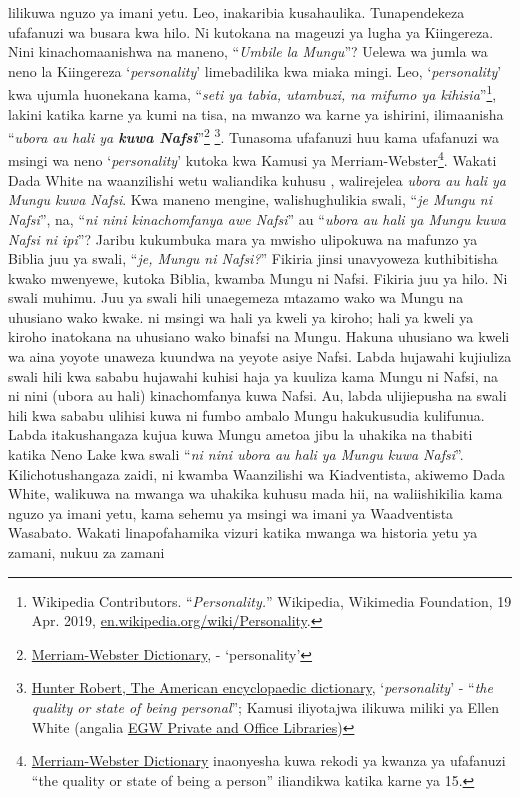  lilikuwa nguzo ya imani yetu. Leo, inakaribia kusahaulika. Tunapendekeza ufafanuzi wa busara kwa hilo. Ni kutokana na mageuzi ya lugha ya Kiingereza. Nini kinachomaanishwa na maneno, “\textit{Umbile la Mungu}”? Uelewa wa jumla wa neno la Kiingereza ‘\textit{personality}’ limebadilika kwa miaka mingi. Leo, ‘\textit{personality}’ kwa ujumla huonekana kama, “\textit{seti ya tabia, utambuzi, na mifumo ya kihisia}”\footnote{Wikipedia Contributors. “\textit{Personality.}” Wikipedia, Wikimedia Foundation, 19 Apr. 2019, \href{https://en.wikipedia.org/wiki/Personality}{en.wikipedia.org/wiki/Personality}.}, lakini katika karne ya kumi na tisa, na mwanzo wa karne ya ishirini, ilimaanisha “\textit{ubora au hali ya \textbf{kuwa Nafsi}}”\footnote{\href{https://www.merriam-webster.com/dictionary/personality}{Merriam-Webster Dictionary}, - ‘personality’} \footnote{\href{https://babel.hathitrust.org/cgi/pt?id=mdp.39015050663213&view=1up&seq=780}{Hunter Robert, The American encyclopaedic dictionary}, ‘\textit{personality}’ - “\textit{the quality or state of being personal}”; Kamusi iliyotajwa ilikuwa miliki ya Ellen White (angalia \href{https://repo.adventistdigitallibrary.org/PDFs/adl-22/adl-22251050.pdf?_ga=2.116010630.1065317374.1621993520-1506151612.1617862694&fbclid=IwAR3vwmp8jxtnpPEKv0KD9mCv8dJpmRGoyIXW0CkbQAjbU0h6YaBGqhgBzbk}{EGW Private and Office Libraries})}. Tunasoma ufafanuzi huu kama ufafanuzi wa msingi wa neno ‘\textit{personality}’ kutoka kwa Kamusi ya Merriam-Webster\footnote{\href{https://www.merriam-webster.com/dictionary/personality\#word-history}{Merriam-Webster Dictionary} inaonyesha kuwa rekodi ya kwanza ya ufafanuzi “the quality or state of being a person” iliandikwa katika karne ya 15.}. Wakati Dada White na waanzilishi wetu waliandika kuhusu , walirejelea \textit{ubora au hali ya Mungu kuwa Nafsi}. Kwa maneno mengine, walishughulikia swali, “\textit{je Mungu ni Nafsi}”, na, “\textit{ni nini kinachomfanya awe Nafsi}” au “\textit{ubora au hali ya Mungu kuwa Nafsi ni ipi}”? Jaribu kukumbuka mara ya mwisho ulipokuwa na mafunzo ya Biblia juu ya swali, “\textit{je, Mungu ni Nafsi?}” Fikiria jinsi unavyoweza kuthibitisha kwako mwenyewe, kutoka Biblia, kwamba Mungu ni Nafsi. Fikiria juu ya hilo. Ni swali muhimu. Juu ya swali hili unaegemeza mtazamo wako wa Mungu na uhusiano wako kwake.  ni msingi wa hali ya kweli ya kiroho; hali ya kweli ya kiroho inatokana na uhusiano wako binafsi na Mungu. Hakuna uhusiano wa kweli wa aina yoyote unaweza kuundwa na yeyote asiye Nafsi. Labda hujawahi kujiuliza swali hili kwa sababu hujawahi kuhisi haja ya kuuliza kama Mungu ni Nafsi, na ni nini (ubora au hali) kinachomfanya kuwa Nafsi. Au, labda ulijiepusha na swali hili kwa sababu ulihisi kuwa ni fumbo ambalo Mungu hakukusudia kulifunua. Labda itakushangaza kujua kuwa Mungu ametoa jibu la uhakika na thabiti katika Neno Lake kwa swali “\textit{ni nini ubora au hali ya Mungu kuwa Nafsi}”. Kilichotushangaza zaidi, ni kwamba Waanzilishi wa Kiadventista, akiwemo Dada White, walikuwa na mwanga wa uhakika kuhusu mada hii, na waliishikilia kama nguzo ya imani yetu, kama sehemu ya msingi wa imani ya Waadventista Wasabato. Wakati  linapofahamika vizuri katika mwanga wa historia yetu ya zamani, nukuu za zamani 